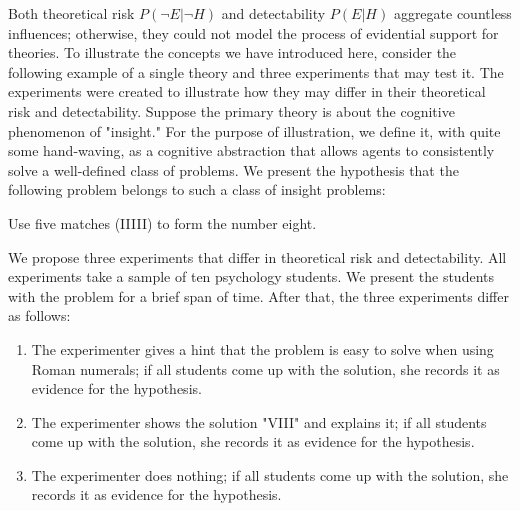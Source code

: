 \documentclass[jou,a4paper]{apa7}
\begin{document}
Both theoretical risk $P(\neg{}E|\neg{}H)$ and detectability $P(E|H)$ aggregate countless influences; otherwise, they could not model the process of evidential support for theories.
To illustrate the concepts we have introduced here, consider the following example of a single theory and three experiments that may test it. 
The experiments were created to illustrate how they may differ in their theoretical risk and detectability.
Suppose the primary theory is about the cognitive phenomenon of "insight."
For the purpose of illustration, we define it, with quite some hand-waving, as a cognitive abstraction that allows agents to consistently solve a well-defined class of problems.
We present the hypothesis that the following problem belongs to such a class of insight problems:

\begin{displayquote}
    Use five matches (IIIII) to form the number eight.
\end{displayquote}

We propose three experiments that differ in theoretical risk and detectability.
All experiments take a sample of ten psychology students.
We present the students with the problem for a brief span of time.
After that, the three experiments differ as follows:

\begin{enumerate}
    \item The experimenter gives a hint that the problem is easy to solve when using Roman numerals; if all students come up with the solution, she records it as evidence for the hypothesis.
    \item The experimenter shows the solution "VIII" and explains it; if all students come up with the solution, she records it as evidence for the hypothesis.
    \item The experimenter does nothing; if all students come up with the solution, she records it as evidence for the hypothesis.
\end{enumerate}
\end{document}
